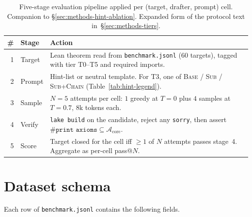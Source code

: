 \begin{table}[!t]
\centering
\small
\setlength{\tabcolsep}{4pt}
\caption{Five-stage evaluation pipeline applied per (target,
drafter, prompt) cell. Companion to
\S\ref{sec:methods-hint-ablation}. Expanded form of the protocol
text in~\S\ref{sec:methods-tiers}.}
\label{tab:eval-protocol}
\begin{tabular}{@{}rlp{}@{}}
\toprule
\# & Stage & Action \\
\midrule
1 & Target  & Lean theorem read from \texttt{benchmark.jsonl}
              ($60$ targets), tagged with tier T0--T5 and required
              imports. \\
2 & Prompt  & Hint-list or neutral template. For T3, one of
              \textsc{Base} / \textsc{Sub} / \textsc{Sub+Chain}
              (Table~\ref{tab:hint-legend}). \\
3 & Sample  & $N{=}5$ attempts per cell: $1$ greedy at $T{=}0$
              plus $4$ samples at $T{=}0.7$, $8$k tokens each. \\
4 & Verify  & \texttt{lake build} on the candidate, reject any
              \texttt{sorry}, then assert
              $\texttt{\#print axioms} \subseteq
              \mathcal{A}_{\text{core}}$. \\
5 & Score   & Target closed for the cell iff $\geq 1$ of $N$
              attempts passes stage~4. Aggregate as
              per-cell pass@$N$. \\
\bottomrule
\end{tabular}

\end{table}

\section{Dataset schema}
\label{app:schema}

Each row of \texttt{benchmark.jsonl} contains the following
fields.

